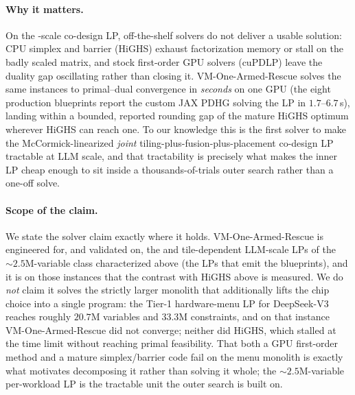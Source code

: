 \paragraph{Why it matters.}
On the \Vone{}-scale co-design LP, off-the-shelf solvers do not deliver a
usable solution: CPU simplex and barrier (HiGHS) exhaust factorization memory
or stall on the badly scaled matrix, and stock first-order GPU solvers
(cuPDLP) leave the duality gap oscillating rather than closing it.
VM-One-Armed-Rescue solves the same instances to primal--dual convergence in
\emph{seconds} on one GPU (the eight production blueprints report the
custom JAX PDHG solving the \Vone{} LP in $1.7$--$6.7$\,s), landing within a
bounded, reported rounding gap of the mature HiGHS optimum wherever HiGHS can
reach one. To our knowledge this is the first solver to make the
McCormick-linearized \emph{joint} tiling-plus-fusion-plus-placement co-design
LP tractable at LLM scale, and that tractability is precisely what makes the
inner LP cheap enough to sit inside a thousands-of-trials outer search rather
than a one-off solve.

\paragraph{Scope of the claim.}
We state the solver claim exactly where it holds. VM-One-Armed-Rescue is
engineered for, and validated on, the \Vone{} and tile-dependent LLM-scale LPs
of the ${\sim}2.5$M-variable class characterized above (the LPs that emit
the blueprints), and it is on those instances that the contrast with HiGHS
above is measured. We do \emph{not} claim it solves the strictly larger
monolith that additionally lifts the chip choice into a single program: the
Tier-1 hardware-menu LP for DeepSeek-V3 reaches roughly $20.7$M variables and
$33.3$M constraints, and on that instance VM-One-Armed-Rescue did not converge;
neither did HiGHS, which stalled at the time limit without reaching
primal feasibility. That both a GPU first-order method and a mature
simplex/barrier code fail on the menu monolith is exactly what motivates
decomposing it rather than solving it whole; the ${\sim}2.5$M-variable
per-workload LP is the tractable unit the outer search is built on.
